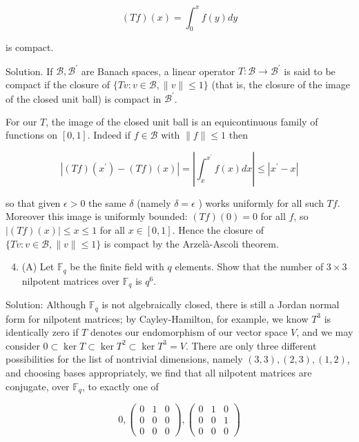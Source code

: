 \documentclass[10pt]{article}
\begin{document}
$$
(T f)(x)=\int_{0}^{x} f(y) d y
$$

is compact.

Solution. If $\mathcal{B}, \mathcal{B}^{\prime}$ are Banach spaces, a linear operator $T: \mathcal{B} \rightarrow \mathcal{B}^{\prime}$ is said to be compact if the closure of $\{T v: v \in \mathcal{B},\|v\| \leq 1\}$ (that is, the closure of the image of the closed unit ball) is compact in $\mathcal{B}^{\prime}$.

For our $T$, the image of the closed unit ball is an equicontinuous family of functions on $[0,1]$. Indeed if $f \in \mathcal{B}$ with $\|f\| \leq 1$ then

$$
\left|(T f)\left(x^{\prime}\right)-(T f)(x)\right|=\left|\int_{x}^{x^{\prime}} f(x) d x\right| \leq\left|x^{\prime}-x\right|
$$

so that given $\epsilon>0$ the same $\delta$ (namely $\delta=\epsilon$ ) works uniformly for all such $T f$. Moreover this image is uniformly bounded: $(T f)(0)=0$ for all $f$, so $|(T f)(x)| \leq x \leq 1$ for all $x \in[0,1]$. Hence the closure of $\{T v: v \in \mathcal{B},\|v\| \leq 1\}$ is compact by the Arzelà-Ascoli theorem.

\begin{enumerate}
  \setcounter{enumi}{3}
  \item (A) Let $\mathbb{F}_{q}$ be the finite field with $q$ elements. Show that the number of $3 \times 3$ nilpotent matrices over $\mathbb{F}_{q}$ is $q^{6}$.
\end{enumerate}

Solution: Although $\mathbb{F}_{q}$ is not algebraically closed, there is still a Jordan normal form for nilpotent matrices; by Cayley-Hamilton, for example, we know $T^{3}$ is identically zero if $T$ denotes our endomorphism of our vector space $V$, and we may consider $0 \subset \operatorname{ker} T \subset \operatorname{ker} T^{2} \subset \operatorname{ker} T^{3}=V$. There are only three different possibilities for the list of nontrivial dimensions, namely $(3,3),(2,3),(1,2)$,
and choosing bases appropriately, we find that all nilpotent matrices are conjugate, over $\mathbb{F}_{q}$, to exactly one of

$$
0,\left(\begin{array}{lll}
0 & 1 & 0 \\
0 & 0 & 0 \\
0 & 0 & 0
\end{array}\right),\left(\begin{array}{lll}
0 & 1 & 0 \\
0 & 0 & 1 \\
0 & 0 & 0
\end{array}\right)
$$
\end{document}
